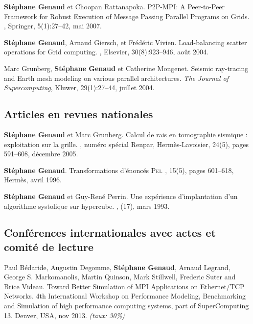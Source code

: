 \documentclass[11pt]{article}
\begin{document}
\begin{thebibliography}{99}
\textbf{Stéphane Genaud} et Choopan Rattanapoka.
\newblock P2P-MPI: A Peer-to-Peer Framework for Robust Execution of Message 
Passing Parallel Programs on Grids.
, Springer, 5(1):27--42, mai 2007.


\textbf{Stéphane Genaud}, Arnaud Giersch, et Frédéric Vivien.
\newblock Load-balancing scatter operations for Grid computing.
, Elsevier, 30(8):923--946, août 2004.

Marc Grunberg, \textbf{Stéphane Genaud} et Catherine Mongenet.
\newblock Seismic ray-tracing and Earth mesh modeling on various parallel
  architectures.
\newblock 
{\em The Journal of Supercomputing}, Kluwer, 29(1):27--44, juillet 2004.


\subsection*{Articles en revues nationales}
\textbf{Stéphane Genaud} et Marc Grunberg. 
\newblock  Calcul de rais en tomographie sismique : exploitation sur la grille.
, numéro spécial Renpar, 
Hermès-Lavoisier, 24(5), pages 591--608, décembre 2005.

\textbf{Stéphane Genaud}.
\newblock Transformations d'énoncés \textsc{Pei}.
, 15(5), pages 601--618, 
Hermès, avril 1996.

\textbf{Stéphane Genaud} et Guy-René Perrin.
\newblock Une expérience d'implantation d'un algorithme systolique sur
  hypercube.
,
  (17), mars 1993.


\subsection*{Conférences internationales avec actes et comité de lecture}


  Paul  Bédaride,  Augustin Degomme,  \textbf{Stéphane  Genaud},
  Arnaud  Legrand,  George  S.  Markomanolis, Martin  Quinson,  Mark  Stillwell,
  Frederic Suter  and Brice Videau.   
\newblock Toward Better Simulation  of MPI
  Applications on  Ethernet/TCP Networks.  
\newblock 4th  International Workshop
  on  Performance  Modeling, Benchmarking  and  Simulation  of high  performance
  computing  systems,  part  of  SuperComputing   13.  Denver,  USA,  nov  2013.
\newblock \small{\textit{(taux: 30\%)}}


\end{thebibliography}
\end{document}
